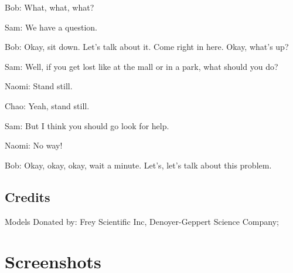 Bob: What, what, what?

Sam: We have a question.

Bob: Okay, sit down. Let's talk about it. Come right in here. Okay, what's up?

Sam: Well, if you get lost like at the mall or in a park, what should you do?

Naomi: Stand still.

Chao: Yeah, stand still.

Sam: But I think you should go look for help.

Naomi: No way!

Bob: Okay, okay, okay, wait a minute. Let's, let's talk about this problem.

\subsection{Credits}

Models Donated by: Frey Scientific Inc, Denoyer-Geppert Science Company;

\clearpage
\newpage

\section{Screenshots}

